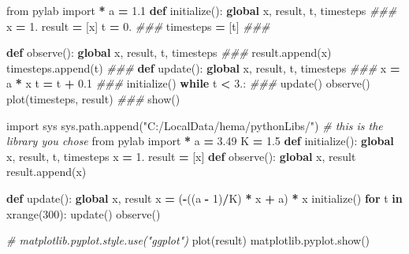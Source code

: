 \documentclass[]{article}
\newenvironment{Shaded}{\begin{snugshade}}{\end{snugshade}}
\newcommand{\KeywordTok}[1]{\textcolor[rgb]{0.13,0.29,0.53}{\textbf{#1}}}
\newcommand{\DecValTok}[1]{\textcolor[rgb]{0.00,0.00,0.81}{#1}}
\newcommand{\FloatTok}[1]{\textcolor[rgb]{0.00,0.00,0.81}{#1}}
\newcommand{\StringTok}[1]{\textcolor[rgb]{0.31,0.60,0.02}{#1}}
\newcommand{\ImportTok}[1]{#1}
\newcommand{\CommentTok}[1]{\textcolor[rgb]{0.56,0.35,0.01}{\textit{#1}}}
\newcommand{\ControlFlowTok}[1]{\textcolor[rgb]{0.13,0.29,0.53}{\textbf{#1}}}
\newcommand{\OperatorTok}[1]{\textcolor[rgb]{0.81,0.36,0.00}{\textbf{#1}}}
\newcommand{\BuiltInTok}[1]{#1}
\newcommand{\NormalTok}[1]{#1}
\begin{document}
\begin{Shaded}
\begin{Highlighting}[]
\ImportTok{from}\NormalTok{ pylab }\ImportTok{import} \OperatorTok{*}
\NormalTok{a }\OperatorTok{=} \FloatTok{1.1}
\KeywordTok{def}\NormalTok{ initialize():}
    \KeywordTok{global}\NormalTok{ x, result, t, timesteps }\CommentTok{###}
\NormalTok{    x }\OperatorTok{=} \DecValTok{1}\NormalTok{.}
\NormalTok{    result }\OperatorTok{=}\NormalTok{ [x]}
\NormalTok{    t }\OperatorTok{=} \DecValTok{0}\NormalTok{. }\CommentTok{###}
\NormalTok{    timesteps }\OperatorTok{=}\NormalTok{ [t] }\CommentTok{###}
    
\KeywordTok{def}\NormalTok{ observe():}
    \KeywordTok{global}\NormalTok{ x, result, t, timesteps }\CommentTok{###}
\NormalTok{    result.append(x)}
\NormalTok{    timesteps.append(t) }\CommentTok{###}
\KeywordTok{def}\NormalTok{ update():}
    \KeywordTok{global}\NormalTok{ x, result, t, timesteps }\CommentTok{###}
\NormalTok{    x }\OperatorTok{=}\NormalTok{ a }\OperatorTok{*}\NormalTok{ x}
\NormalTok{    t }\OperatorTok{=}\NormalTok{ t }\OperatorTok{+} \FloatTok{0.1} \CommentTok{###}
\NormalTok{initialize()}
\ControlFlowTok{while}\NormalTok{ t }\OperatorTok{<} \DecValTok{3}\NormalTok{.: }\CommentTok{###}
\NormalTok{    update()}
\NormalTok{    observe()}
\NormalTok{plot(timesteps, result) }\CommentTok{###}
\NormalTok{show()}
\end{Highlighting}
\end{Shaded}

\begin{Shaded}
\begin{Highlighting}[]
\ImportTok{import}\NormalTok{ sys}
\NormalTok{sys.path.append(}\StringTok{"C:/LocalData/hema/pythonLibs/"}\NormalTok{) }\CommentTok{# this is the library you chose}
\ImportTok{from}\NormalTok{ pylab }\ImportTok{import} \OperatorTok{*}
\NormalTok{a }\OperatorTok{=} \FloatTok{3.49}
\NormalTok{K }\OperatorTok{=} \FloatTok{1.5}
\KeywordTok{def}\NormalTok{ initialize():}
    \KeywordTok{global}\NormalTok{ x, result, t, timesteps}
\NormalTok{    x }\OperatorTok{=} \DecValTok{1}\NormalTok{.}
\NormalTok{    result }\OperatorTok{=}\NormalTok{ [x]}
\KeywordTok{def}\NormalTok{ observe():}
    \KeywordTok{global}\NormalTok{ x, result}
\NormalTok{    result.append(x)}
    
\KeywordTok{def}\NormalTok{ update():}
    \KeywordTok{global}\NormalTok{ x, result}
\NormalTok{    x }\OperatorTok{=}\NormalTok{ (}\OperatorTok{-}\NormalTok{((a }\OperatorTok{-} \DecValTok{1}\NormalTok{)}\OperatorTok{/}\NormalTok{K) }\OperatorTok{*}\NormalTok{ x }\OperatorTok{+}\NormalTok{ a) }\OperatorTok{*}\NormalTok{ x}
\NormalTok{initialize()}
\ControlFlowTok{for}\NormalTok{ t }\KeywordTok{in} \BuiltInTok{xrange}\NormalTok{(}\DecValTok{300}\NormalTok{):}
\NormalTok{  update()}
\NormalTok{  observe()}
  
\CommentTok{# matplotlib.pyplot.style.use("ggplot")}
\NormalTok{plot(result)}
\NormalTok{matplotlib.pyplot.show()}
\end{Highlighting}
\end{Shaded}
\end{document}
